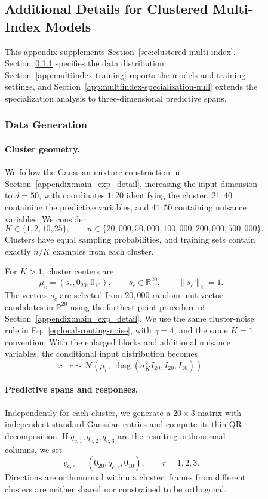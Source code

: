 \documentclass{article}
\newcounter{setting}[section]
\newcounter{model}[section]
\begin{document}
\begin{figure}
\newpage

\subsection{Additional Details for Clustered Multi-Index Models}
\label{app:clustered-multi-index-details}

This appendix supplements Section~\ref{sec:clustered-multi-index}.
Section~\ref{app:multiindex-data} specifies the data distribution.
Section~\ref{app:multiindex-training} reports the models and training settings, and
Section~\ref{app:multiindex-specialization-null} extends the specialization
analysis to three-dimensional predictive spans.

\subsubsection{Data Generation}
\label{app:multiindex-data}

\paragraph{Cluster geometry.}
We follow the Gaussian-mixture construction in
Section~\ref{appendix:main_exp_detail}, increasing the input dimension to
\(d=50\), with coordinates \(1{:}20\) identifying the cluster,
\(21{:}40\) containing the predictive variables, and \(41{:}50\)
containing nuisance variables. We consider
\[
    K\in\{1,2,10,25\},
    \qquad
    n\in\{20{,}000,50{,}000,100{,}000,200{,}000,500{,}000\}.
\]
Clusters have equal sampling probabilities, and training sets contain
exactly \(n/K\) examples from each cluster.

For \(K>1\), cluster centers are
\[
    \mu_c=(s_c,0_{20},0_{10}),
    \qquad
    s_c\in\mathbb R^{20},
    \qquad
    \|s_c\|_2=1.
\]
The vectors \(s_c\) are selected from \(20{,}000\) random unit-vector
candidates in \(\mathbb R^{20}\) using the farthest-point procedure of
Section~\ref{appendix:main_exp_detail}. We use the same cluster-noise rule
in Eq.~\ref{eq:local-routing-noise}, with \(\gamma=4\), and the same
\(K=1\) convention. With the enlarged blocks and additional nuisance
variables, the conditional input distribution becomes
\[
    x\mid c
    \sim
    \mathcal N\!\left(
        \mu_c,\,
        \operatorname{diag}(\sigma_K^2I_{20},I_{20},I_{10})
    \right).
\]

\paragraph{Predictive spans and responses.}
Independently for each cluster, we generate a \(20\times3\) matrix with
independent standard Gaussian entries and compute its thin QR
decomposition. If \(q_{c,1},q_{c,2},q_{c,3}\) are the resulting orthonormal
columns, we set
\[
    v_{c,r}=(0_{20},q_{c,r},0_{10}),
    \qquad r=1,2,3.
\]
Directions are orthonormal within a cluster; frames from different
clusters are neither shared nor constrained to be orthogonal.


\end{figure}
\end{document}
